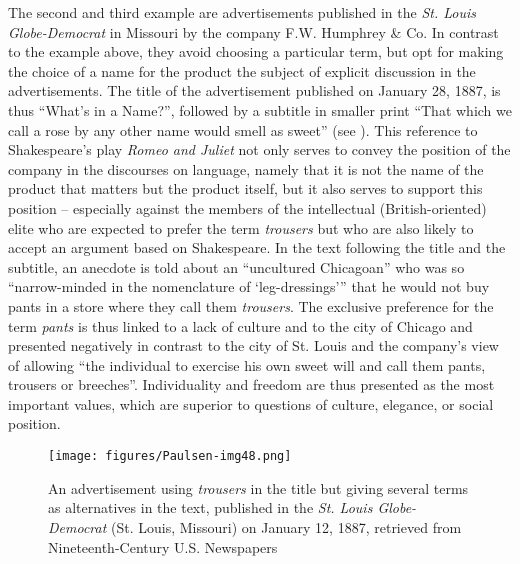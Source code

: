 The second and third example are advertisements published in the \textit{St. Louis Globe-Democrat} in Missouri by the company F.W. Humphrey \& Co. In contrast to the example above, they avoid choosing a particular term, but opt for making the choice of a name for the product the subject of explicit discussion in the advertisements. The title of the advertisement published on January 28, 1887, is thus “What’s in a Name?”, followed by a subtitle in smaller print “That which we call a rose by any other name would smell as sweet” (see ). This reference to Shakespeare’s play \emph{Romeo and Juliet} not only serves to convey the position of the company in the discourses on language, namely that it is not the name of the product that matters but the product itself, but it also serves to support this position – especially against the members of the intellectual (British-oriented) elite who are expected to prefer the term \emph{trousers} but who are also likely to accept an argument based on Shakespeare. In the text following the title and the subtitle, an anecdote is told about an “uncultured Chicagoan” who was so “narrow-minded in the nomenclature of ‘leg-dressings’” that he would not buy pants in a store where they call them \emph{trousers}. The exclusive preference for the term \emph{pants} is thus linked to a lack of culture and to the city of Chicago and presented negatively in contrast to the city of St. Louis and the company’s view of allowing “the individual to exercise his own sweet will and call them pants, trousers or breeches”. Individuality and freedom are thus presented as the most important values, which are superior to questions of culture, elegance, or social position.



\begin{figure}[b]
\texttt{[image: figures/Paulsen-img48.png]}
\caption{
An advertisement using \emph{trousers} in the title but giving several terms as alternatives in the text, published in the \emph{St. Louis Globe-Democrat} (St. Louis, Missouri) on January 12, 1887, retrieved from Nineteenth-Century U.S. Newspapers
}
\label{fig:key:48}
\end{figure}

